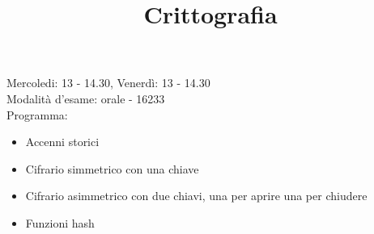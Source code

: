\documentclass[11pt, oneside]{article}   	%
\title{Crittografia}
\begin{document}
\maketitle
Mercoledi: 13 - 14.30, 
Venerdì: 13 - 14.30\\
Modalità d'esame: orale - 16233\\
Programma:
\begin{itemize}
\item Accenni storici
\item Cifrario simmetrico con una chiave
\item Cifrario asimmetrico con due chiavi, una per aprire una per chiudere
\item Funzioni hash
\end{itemize}
\end{document}
